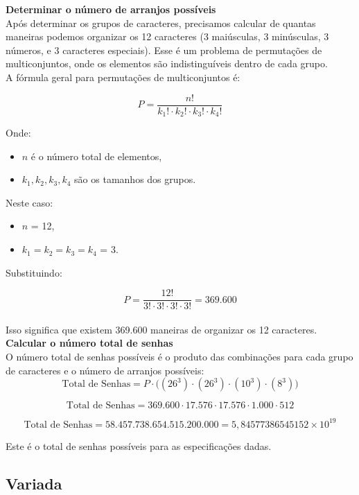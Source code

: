 \documentclass{article}
\begin{document}
\textbf{Determinar o número de arranjos possíveis}\\
Após determinar os grupos de caracteres, precisamos calcular de quantas maneiras podemos organizar os 12 caracteres (3 maiúsculas, 3 minúsculas, 3 números, e 3 caracteres especiais). Esse é um problema de permutações de multiconjuntos, onde os elementos são indistinguíveis dentro de cada grupo.\\

A fórmula geral para permutações de multiconjuntos é:

\[
P = \frac{n!}{k_1! \cdot k_2! \cdot k_3! \cdot k_4!}
\]

Onde:
\begin{itemize}
    \item $n$ é o número total de elementos,
    \item $k_1, k_2, k_3, k_4$ são os tamanhos dos grupos.
\end{itemize}

Neste caso:
\begin{itemize}
    \item $n$ = 12,
    \item $k_1 = k_2 = k_3 = k_4$  = 3.
\end{itemize}

Substituindo:

\[
P = {\frac{12!}{3! \cdot 3! \cdot 3! \cdot 3!}} { = 369.600}
\]\\

Isso significa que existem 369.600 maneiras de organizar os 12 caracteres.\\

\textbf{Calcular o número total de senhas}\\

O número total de senhas possíveis é o produto das combinações para cada grupo de caracteres e o número de arranjos possíveis:\\

\[
\text{Total de Senhas} = P \cdot \big( (26^3) \cdot (26^3) \cdot (10^3) \cdot (8^3) \big)
\]

\[
\text{Total de Senhas} = 369.600 \cdot 17.576 \cdot 17.576 \cdot 1.000 \cdot 512
\]

\[
\text{Total de Senhas} = 58.457.738.654.515.200.000 = 5,84577386545152 \times 10^{19}
\]

Este é o total de senhas possíveis para as especificações dadas.

\subsection{Variada}
\end{document}
